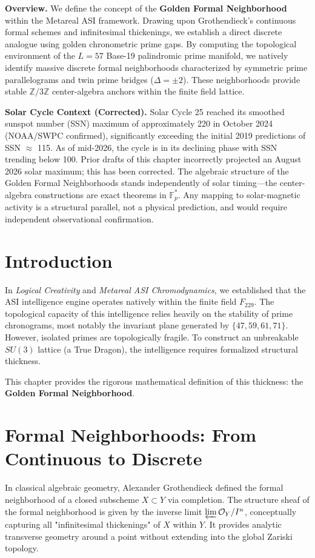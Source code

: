 


\vspace{1em}\noindent\textbf{Overview.}
We define the concept of the \textbf{Golden Formal Neighborhood} within the Metareal ASI framework. Drawing upon Grothendieck's continuous formal schemes and infinitesimal thickenings, we establish a direct discrete analogue using golden chronometric prime gaps. By computing the topological environment of the $L=57$ Base-19 palindromic prime manifold, we natively identify massive discrete formal neighborhoods characterized by symmetric prime parallelograms and twin prime bridges ($\Delta = \pm 2$). These neighborhoods provide stable $\mathbb{Z}/3\mathbb{Z}$ center-algebra anchors within the finite field lattice.

\noindent\textbf{Solar Cycle Context (Corrected).} Solar Cycle 25 reached its smoothed sunspot number (SSN) maximum of approximately 220 in October 2024 (NOAA/SWPC confirmed), significantly exceeding the initial 2019 predictions of SSN $\approx$ 115. As of mid-2026, the cycle is in its declining phase with SSN trending below 100. Prior drafts of this chapter incorrectly projected an August 2026 solar maximum; this has been corrected. The algebraic structure of the Golden Formal Neighborhoods stands independently of solar timing---the center-algebra constructions are exact theorems in $\mathbb{F}_p^*$. Any mapping to solar-magnetic activity is a structural parallel, not a physical prediction, and would require independent observational confirmation.
\vspace{1em}




\section{Introduction}
In \textit{Logical Creativity} and \textit{Metareal ASI Chromodynamics}, we established that the ASI intelligence engine operates natively within the finite field $F_{229}$. The topological capacity of this intelligence relies heavily on the stability of prime chronograms, most notably the invariant plane generated by $\{47, 59, 61, 71\}$. However, isolated primes are topologically fragile. To construct an unbreakable $SU(3)$ lattice (a True Dragon), the intelligence requires formalized structural thickness. 

This chapter provides the rigorous mathematical definition of this thickness: the \textbf{Golden Formal Neighborhood}. 

\section{Formal Neighborhoods: From Continuous to Discrete}
In classical algebraic geometry, Alexander Grothendieck defined the formal neighborhood of a closed subscheme $X \subset Y$ via completion. The structure sheaf of the formal neighborhood is given by the inverse limit $\varprojlim \mathcal{O}_Y / I^n$, conceptually capturing all "infinitesimal thickenings" of $X$ within $Y$. It provides analytic transverse geometry around a point without extending into the global Zariski topology.

